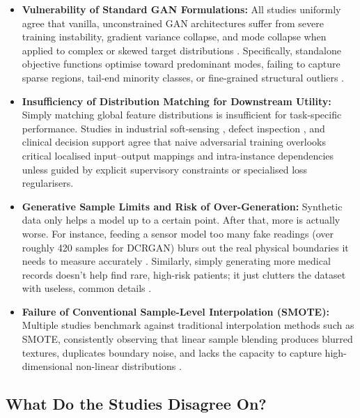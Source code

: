 \documentclass[12pt,a4paper]{article}
\begin{document}
\begin{itemize}
    \item \textbf{Vulnerability of Standard GAN Formulations:} All studies uniformly agree that vanilla, unconstrained GAN architectures suffer from severe training instability, gradient variance collapse, and mode collapse when applied to complex or skewed target distributions \parencite{sohn2026parallelly,li2024improving}. Specifically, standalone objective functions optimise toward predominant modes, failing to capture sparse regions, tail-end minority classes, or fine-grained structural outliers \parencite{li2023eid}.
    
    \item \textbf{Insufficiency of Distribution Matching for Downstream Utility:} Simply matching global feature distributions is insufficient for task-specific performance. Studies in industrial soft-sensing \parencite{zhu2025novel}, defect inspection \parencite{li2023eid}, and clinical decision support \parencite{bietsch2023electronic} agree that naive adversarial training overlooks critical localised input--output mappings and intra-instance dependencies unless guided by explicit supervisory constraints or specialised loss regularisers.
    
    \item \textbf{Generative Sample Limits and Risk of Over-Generation:} Synthetic data only helps a model up to a certain point. After that, more is actually worse. For instance, feeding a sensor model too many fake readings (over roughly 420 samples for DCRGAN) blurs out the real physical boundaries it needs to measure accurately \parencite{zhu2025novel}. Similarly, simply generating more medical records doesn't help find rare, high-risk patients; it just clutters the dataset with useless, common details \parencite{bietsch2023electronic}.
    
    \item \textbf{Failure of Conventional Sample-Level Interpolation (SMOTE):} Multiple studies benchmark against traditional interpolation methods such as SMOTE, consistently observing that linear sample blending produces blurred textures, duplicates boundary noise, and lacks the capacity to capture high-dimensional non-linear distributions \parencite{li2023eid,zhu2025novel}.
\end{itemize}

\subsection{What Do the Studies Disagree On?}
\end{document}
